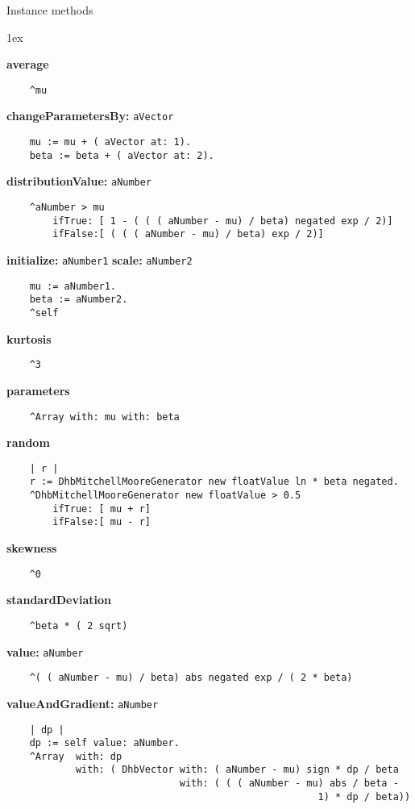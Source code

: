 Instance methods
{\parskip 1ex\par\noindent}
{\bf average}
\begin{verbatim}
    ^mu

\end{verbatim}
{\bf changeParametersBy:} {\tt aVector}
\begin{verbatim}
    mu := mu + ( aVector at: 1).
    beta := beta + ( aVector at: 2).

\end{verbatim}
{\bf distributionValue:} {\tt aNumber}
\begin{verbatim}
    ^aNumber > mu
        ifTrue: [ 1 - ( ( ( aNumber - mu) / beta) negated exp / 2)]
        ifFalse:[ ( ( ( aNumber - mu) / beta) exp / 2)]

\end{verbatim}
{\bf initialize:} {\tt aNumber1} {\bf scale:} {\tt aNumber2}
\begin{verbatim}
    mu := aNumber1.
    beta := aNumber2.
    ^self

\end{verbatim}
{\bf kurtosis}
\begin{verbatim}
    ^3

\end{verbatim}
{\bf parameters}
\begin{verbatim}
    ^Array with: mu with: beta

\end{verbatim}
{\bf random}
\begin{verbatim}
    | r |
    r := DhbMitchellMooreGenerator new floatValue ln * beta negated.
    ^DhbMitchellMooreGenerator new floatValue > 0.5
        ifTrue: [ mu + r]
        ifFalse:[ mu - r]

\end{verbatim}
{\bf skewness}
\begin{verbatim}
    ^0

\end{verbatim}
{\bf standardDeviation}
\begin{verbatim}
    ^beta * ( 2 sqrt)

\end{verbatim}
{\bf value:} {\tt aNumber}
\begin{verbatim}
    ^( ( aNumber - mu) / beta) abs negated exp / ( 2 * beta)

\end{verbatim}
{\bf valueAndGradient:} {\tt aNumber}
\begin{verbatim}
    | dp |
    dp := self value: aNumber.
    ^Array  with: dp
            with: ( DhbVector with: ( aNumber - mu) sign * dp / beta
                              with: ( ( ( aNumber - mu) abs / beta - 
                                                      1) * dp / beta))

\end{verbatim}

